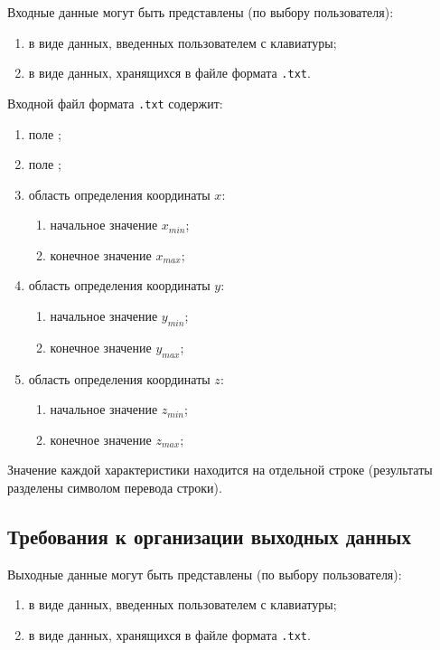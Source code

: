 \documentclass[14pt,a4paper,final]{extreport}
\begin{document}
Входные данные могут быть представлены (по выбору пользователя):
\begin{enumerate}[label=\asbuk*),ref=\asbuk*]
	\item в виде данных, введенных пользователем с клавиатуры;
	\item в виде данных, хранящихся в файле формата \texttt{.txt}.
\end{enumerate}

Входной файл формата \texttt{.txt} содержит:
\begin{enumerate}[label=\arabic*.,ref=\arabic*]
	\item поле \fieldA;
	\item поле \fieldB;
	\item область определения координаты \( x \):
	\begin{enumerate}[label=\asbuk*)]
		\item начальное значение \( x_{min} \);
		\item конечное значение \( x_{max} \);
	\end{enumerate}
	
	\item область определения координаты \( y \):
	\begin{enumerate}[label=\asbuk*)]
		\item начальное значение \( y_{min} \);
		\item конечное значение \( y_{max} \);
	\end{enumerate}

	\item область определения координаты \( z \):
	\begin{enumerate}[label=\asbuk*)]
		\item начальное значение \( z_{min} \);
		\item конечное значение \( z_{max} \);
	\end{enumerate}
\end{enumerate}

Значение каждой характеристики находится на отдельной строке (результаты разделены символом перевода строки).


\subsection{Требования к организации выходных данных}

Выходные данные могут быть представлены (по выбору пользователя):
\begin{enumerate}[label=\asbuk*),ref=\asbuk*]
	\item в виде данных, введенных пользователем с клавиатуры;
	\item в виде данных, хранящихся в файле формата \texttt{.txt}.
\end{enumerate}
\end{document}
